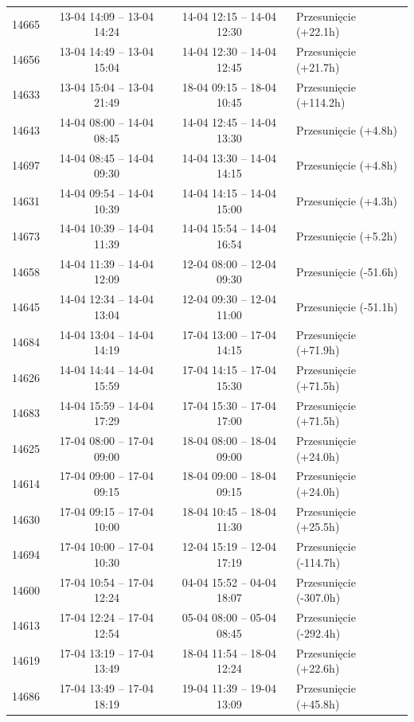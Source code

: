 \begin{table}[htbp]
\begin{tabular}{|r|c|c|l|}
14665 & 13-04 14:09 -- 13-04 14:24 & 14-04 12:15 -- 14-04 12:30 & Przesunięcie (+22.1h) \\ 
14656 & 13-04 14:49 -- 13-04 15:04 & 14-04 12:30 -- 14-04 12:45 & Przesunięcie (+21.7h) \\ 
14633 & 13-04 15:04 -- 13-04 21:49 & 18-04 09:15 -- 18-04 10:45 & Przesunięcie (+114.2h) \\ 
14643 & 14-04 08:00 -- 14-04 08:45 & 14-04 12:45 -- 14-04 13:30 & Przesunięcie (+4.8h) \\ 
14697 & 14-04 08:45 -- 14-04 09:30 & 14-04 13:30 -- 14-04 14:15 & Przesunięcie (+4.8h) \\ 
14631 & 14-04 09:54 -- 14-04 10:39 & 14-04 14:15 -- 14-04 15:00 & Przesunięcie (+4.3h) \\ 
14673 & 14-04 10:39 -- 14-04 11:39 & 14-04 15:54 -- 14-04 16:54 & Przesunięcie (+5.2h) \\ 
14658 & 14-04 11:39 -- 14-04 12:09 & 12-04 08:00 -- 12-04 09:30 & Przesunięcie (-51.6h) \\ 
14645 & 14-04 12:34 -- 14-04 13:04 & 12-04 09:30 -- 12-04 11:00 & Przesunięcie (-51.1h) \\ 
14684 & 14-04 13:04 -- 14-04 14:19 & 17-04 13:00 -- 17-04 14:15 & Przesunięcie (+71.9h) \\ 
14626 & 14-04 14:44 -- 14-04 15:59 & 17-04 14:15 -- 17-04 15:30 & Przesunięcie (+71.5h) \\ 
14683 & 14-04 15:59 -- 14-04 17:29 & 17-04 15:30 -- 17-04 17:00 & Przesunięcie (+71.5h) \\ 
14625 & 17-04 08:00 -- 17-04 09:00 & 18-04 08:00 -- 18-04 09:00 & Przesunięcie (+24.0h) \\ 
14614 & 17-04 09:00 -- 17-04 09:15 & 18-04 09:00 -- 18-04 09:15 & Przesunięcie (+24.0h) \\ 
14630 & 17-04 09:15 -- 17-04 10:00 & 18-04 10:45 -- 18-04 11:30 & Przesunięcie (+25.5h) \\ 
14694 & 17-04 10:00 -- 17-04 10:30 & 12-04 15:19 -- 12-04 17:19 & Przesunięcie (-114.7h) \\ 
14600 & 17-04 10:54 -- 17-04 12:24 & 04-04 15:52 -- 04-04 18:07 & Przesunięcie (-307.0h) \\ 
14613 & 17-04 12:24 -- 17-04 12:54 & 05-04 08:00 -- 05-04 08:45 & Przesunięcie (-292.4h) \\ 
14619 & 17-04 13:19 -- 17-04 13:49 & 18-04 11:54 -- 18-04 12:24 & Przesunięcie (+22.6h) \\ 
14686 & 17-04 13:49 -- 17-04 18:19 & 19-04 11:39 -- 19-04 13:09 & Przesunięcie (+45.8h) \\ 

\end{tabular}
\end{table}
